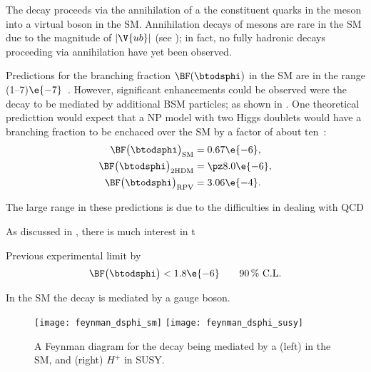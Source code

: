 The decay \btodsphi proceeds via the annihilation of a the constituent quarks in the \Bp meson into
a virtual \Wp boson in the SM.
Annihilation decays of \Bp mesons are rare in the SM due to the magnitude of $|\V{ub}|$ (see
); in fact, no fully hadronic decays proceeding via annihilation have yet been
observed.

Predictions for the branching fraction $\BF(\btodsphi)$ in the SM are in
the range (1--7)$\e{-7}$~\cite{Zou:2009zza,Mohanta:2002wf,PhysRevD.76.057701,Lu:2001yz}.
However, significant enhancements could be observed were the decay to be mediated by additional BSM
particles; as shown in .
One theoretical predicttion would expect that a NP model with two Higgs doublets would have a
branching fraction to be enchaced over the SM by a factor of about ten~\cite{Mohanta:2002wf}:
\begin{align}
  \BF\big(\btodsphi\big)_\mathrm{SM}&=0.67\e{-6}, \nonumber\\
  \BF\big(\btodsphi\big)_\mathrm{2HDM}&=\pz8.0\e{-6}, \nonumber\\
  \BF\big(\btodsphi\big)_\mathrm{RPV}&=3.06\e{-4}.
\end{align}


The large range in these predictions is due to the difficulties in dealing with QCD



As discussed in , there is much interest in t

Previous experimental limit by \babar \cite{Aubert:2005gd}
\begin{equation}
  \BF\big(\btodsphi\big) < 1.8\e{-6} \qquad \text{90\,\% C.L.}
\end{equation}


In the SM the decay is mediated by a \Wp gauge boson.

\begin{figure}
  \begin{center}
    \texttt{[image: feynman\_dsphi\_sm]}
    \texttt{[image: feynman\_dsphi\_susy]}
    \caption[Feynman diagram for the decay \btodsphi]
    {\small
      A Feynman diagram for the decay \btodsphi being mediated by a
      (left) \Wp in the SM, and
      (right) $H^+$ in SUSY.
    }
    \label{fig:dsphi:feyn}
  \end{center}
\end{figure}



